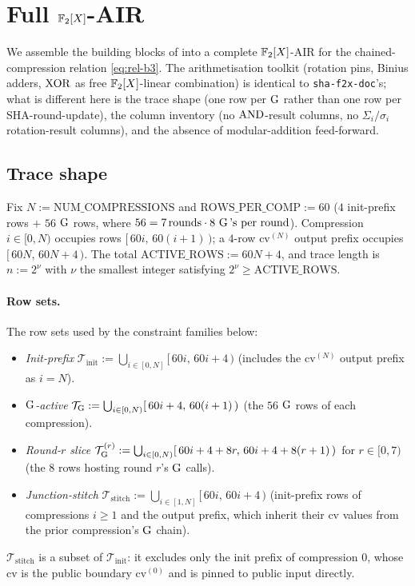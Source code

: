 \section{Full $\mathbb{F}_2[X]$-AIR}\label{sec:uair}

We assemble the building blocks of  into a complete
$\mathbb{F}_2[X]$-AIR for the chained-compression relation \eqref{eq:rel-b3}.
The arithmetisation toolkit (rotation pins, Binius adders, $\operatorname{XOR}$ as
free $\mathbb{F}_2[X]$-linear combination) is identical to
\texttt{sha-f2x-doc}'s; what is different here is the trace shape
(one row per $\operatorname{G}$ rather than one row per SHA-round-update), the
column inventory (no $\operatorname{AND}$-result columns, no
$\Sigma_i / \sigma_i$ rotation-result columns), and the absence of
modular-addition feed-forward.

\subsection{Trace shape}\label{sec:b3-trace-shape}

Fix $N := \mathrm{NUM\_COMPRESSIONS}$ and
$\mathrm{ROWS\_PER\_COMP} := 60$ ($4$ init-prefix rows $+$ $56$
$\operatorname{G}$ rows, where $56 = 7\,\text{rounds} \cdot 8\,\operatorname{G}\text{'s per round}$).
Compression $i \in [0, N)$ occupies rows $[\,60i,\,60(i+1)\,)$; a
$4$-row $\mathrm{cv}^{(N)}$ output prefix occupies $[\,60N,\,60N+4\,)$.
The total $\mathrm{ACTIVE\_ROWS} := 60N + 4$, and trace length is
$n := 2^{\nu}$ with $\nu$ the smallest integer satisfying $2^{\nu} \ge
\mathrm{ACTIVE\_ROWS}$.

\paragraph{Row sets.}
The row sets used by the constraint families below:
\begin{itemize}[leftmargin=2em,topsep=2pt]
  \item \emph{Init-prefix}
        $\mathcal{T}_{\mathrm{init}} := \bigcup_{i \in [0,N]} [\,60i,\,60i + 4\,)$
        (includes the $\mathrm{cv}^{(N)}$ output prefix as $i = N$).
  \item \emph{$\operatorname{G}$-active}
        $\mathcal{T}_{\operatorname{G}} := \bigcup_{i \in [0,N)} [\,60i + 4,\,60(i+1)\,)$
        (the $56$ $\operatorname{G}$ rows of each compression).
  \item \emph{Round-$r$ slice}
        $\mathcal{T}_{\operatorname{G}}^{(r)} :=
        \bigcup_{i \in [0,N)} [\,60i + 4 + 8r,\,60i + 4 + 8(r+1)\,)$
        for $r \in [0, 7)$ (the $8$ rows hosting round $r$'s $\operatorname{G}$ calls).
  \item \emph{Junction-stitch}
        $\mathcal{T}_{\mathrm{stitch}} :=
        \bigcup_{i \in [1,N]} [\,60i,\,60i + 4\,)$
        (init-prefix rows of compressions $i \ge 1$ and the output prefix,
        which inherit their cv values from the prior compression's
        $\operatorname{G}$ chain).
\end{itemize}
$\mathcal{T}_{\mathrm{stitch}}$ is a subset of $\mathcal{T}_{\mathrm{init}}$:
it excludes only the init prefix of compression $0$, whose cv is the
public boundary $\mathrm{cv}^{(0)}$ and is pinned to public input
directly.


